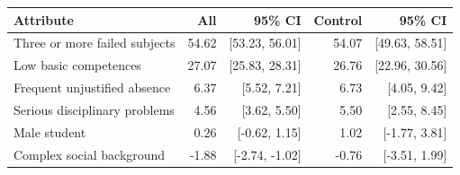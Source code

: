 \begin{tabular}{lrrrr}
\toprule
Attribute & All & 95\% CI & Control & 95\% CI \\
\midrule
Three or more failed subjects & 54.62 & [53.23, 56.01] & 54.07 & [49.63, 58.51] \\
Low basic competences & 27.07 & [25.83, 28.31] & 26.76 & [22.96, 30.56] \\
Frequent unjustified absence & 6.37 & [5.52, 7.21] & 6.73 & [4.05, 9.42] \\
Serious disciplinary problems & 4.56 & [3.62, 5.50] & 5.50 & [2.55, 8.45] \\
Male student & 0.26 & [-0.62, 1.15] & 1.02 & [-1.77, 3.81] \\
Complex social background & -1.88 & [-2.74, -1.02] & -0.76 & [-3.51, 1.99] \\
\bottomrule
\end{tabular}
